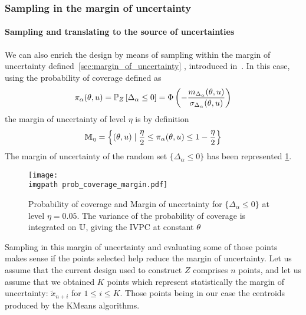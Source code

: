 \documentclass[../../Main_ManuscritThese.tex]{subfiles}
\newcommand\imgpath{/home/victor/acadwriting/Manuscrit/Text/Chapter4/img/}
\begin{document}
\subsubsection{Sampling in the margin of uncertainty}
\paragraph{Sampling and translating to the source of uncertainties}
We can also enrich the design by means of sampling within the margin
of uncertainty defined~\cref{sec:margin_of_uncertainty}
, introduced
in~\cite{echard_ak-mcs_2011,schobi_rare_2017,razaaly_rare_2019}. %
In this case, using the probability of coverage defined as
\begin{equation}
  \pi_{\alpha}(\theta, u) = \mathbb{P}_{Z}\left[\Delta_{\alpha} \leq 0\right] = \Phi\left(-\frac{m_{\Delta_\alpha}(\theta, u)}{\sigma_{\Delta_\alpha}(\theta, u)}\right)
\end{equation}
the margin of uncertainty of level $\eta$ is by definition
\begin{equation}
  \mathbb{M}_{\eta} = \left\{ (\theta, u) \mid \frac{\eta}{2} \leq \pi_{\alpha}(\theta, u) \leq 1 - \frac{\eta}{2}\right\}
\end{equation}
The margin of uncertainty of the random set $\{\Delta_{\alpha} \leq 0\}$ has been represented \cref{fig:prob_coverage_margin}.
\begin{figure}[ht]
  \centering
  \texttt{[image: \\imgpath prob\_coverage\_margin.pdf]}
  \caption[Probability of coverage and margin of uncertainty]{\label{fig:prob_coverage_margin} Probability of coverage
    and Margin of uncertainty for $\{\Delta_{\alpha} \leq 0\}$ at
    level $\eta=0.05$. The variance of the probability of coverage is
    integrated on $\mathbb{U}$, giving the IVPC at constant $\theta$}
\end{figure}

Sampling in this margin of uncertainty and evaluating some of those
points makes sense if the points selected help reduce the margin of
uncertainty.  Let us assume that the current design used to construct
$Z$ comprises $n$ points, and let us assume that we obtained $K$
points which represent statistically the margin of uncertainty:
$\tilde{x}_{n+i}$ for $1\leq i\leq K$. Those points being in our case
the centroids produced by the KMeans algorithms.
\end{document}
